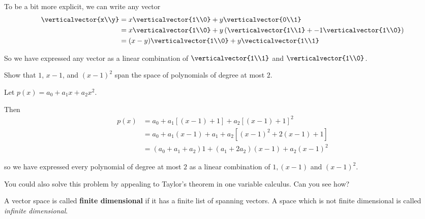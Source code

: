\documentclass{ximera}
\begin{document}
\begin{Basis and Dimension}
\begin{free-response}
	 To be a bit more explicit, we can write any vector \begin{align*}
	 \verticalvector{x\\y} &= x\verticalvector{1\\0}+ y\verticalvector{0\\1}\\
	 &= x\verticalvector{1\\0}+ y\left(\verticalvector{1\\1} +-1\verticalvector{1\\0}\right)\\
	 &=(x-y)\verticalvector{1\\0}+y\vecticalvector{1\\1}
	 \end{align*}
	 
	 So we have expressed any vector as a linear combination of $\verticalvector{1\\1}$ and $\verticalvector{1\\0}$.
\end{free-response} 

 
 	Show that $1$, $x-1$, and $(x-1)^2$  span the space of polynomials of degree at most $2$.

\begin{free-response}
	Let $p(x)=a_0+a_1x+a_2x^2$. 
	
	Then \begin{align*}
		p(x) &= a_0+a_1[(x-1)+1]+a_2[(x-1)+1]^2\\
			   &= a_0+a_1(x-1)+a_1+a_2[(x-1)^2+2(x-1)+1]\\
			   &= (a_0+a_1+a_2)1+(a_1+2a_2)(x-1)+a_2(x-1)^2
		\end{align*}
	
	so we have expressed every polynomial of degree at most $2$ as a linear combination of $1,(x-1)$ and $(x-1)^2$.
	
	You could also solve this problem by appealing to Taylor's theorem in one variable calculus.  Can you see how?
\end{free-response}

 
  \begin{definition}
 	A vector space is called \textbf{finite dimensional} if it has a finite list of spanning vectors.  A space which is not finite dimensional is called \textit{infinite dimensional}.
 \end{definition}
 

\end{Basis and Dimension}
\end{document}
